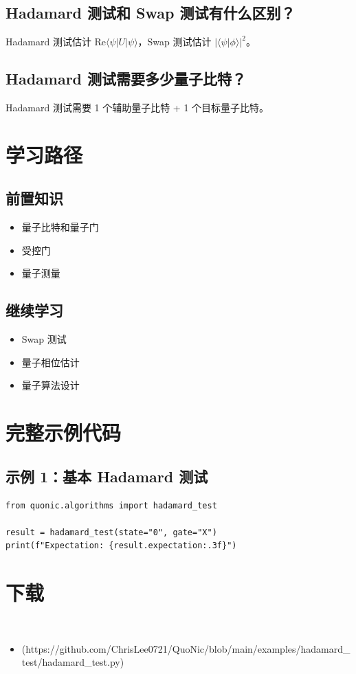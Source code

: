 \documentclass[12pt,a4paper]{article}
\begin{document}
\subsection{Hadamard 测试和 Swap 测试有什么区别？}

Hadamard 测试估计 $\text{Re}\langle\psi|U|\psi\rangle$，Swap 测试估计 $|\langle\psi|\phi\rangle|^2$。

\subsection{Hadamard 测试需要多少量子比特？}

Hadamard 测试需要 1 个辅助量子比特 + 1 个目标量子比特。

\section{学习路径}

\subsection{前置知识}
\begin{itemize}
  \item 量子比特和量子门
  \item 受控门
  \item 量子测量
\end{itemize}

\subsection{继续学习}
\begin{itemize}
  \item Swap 测试
  \item 量子相位估计
  \item 量子算法设计
\end{itemize}

\section{完整示例代码}

\subsection{示例 1：基本 Hadamard 测试}

\begin{lstlisting}[style=python]
from quonic.algorithms import hadamard_test

result = hadamard_test(state="0", gate="X")
print(f"Expectation: {result.expectation:.3f}")
\end{lstlisting}


\section{下载}

\begin{itemize}
  \item [hadamard_test.py](https://github.com/ChrisLee0721/QuoNic/blob/main/examples/hadamard_test/hadamard_test.py)
\end{itemize}
\end{document}
